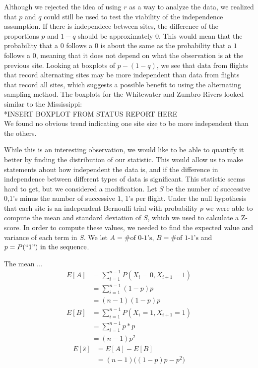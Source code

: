 \documentclass{article}
\begin{document}
	Although we rejected the idea of using \(r\) as a way to analyze the data, 
we realized that \(p\) and \(q\) could still be used to test the viability of 
the independence assumption.  If there is independece between sites, the 
difference of the proportions \(p\) and \(1-q\) should be approximately \(0\). 
This would mean that the probability that a \(0\) follows a \(0\) is about the 
same as the probability that a \(1\) follows a \(0\), meaning that it does not 
depend on what the observation is at the previous site.  Looking at boxplots of 
\(p - (1-q)\), we see that data from flights that record alternating sites may 
be more independent than data from flights that record all sites, which suggests
a possible benefit to using the alternating sampling method.  The boxplots for 
the Whitewater and Zumbro Rivers looked similar to the Mississippi:  \\
*INSERT BOXPLOT FROM STATUS REPORT HERE  \\
We found no obvious trend indicating one site size to be more independent than 
the others.  

	While this is an interesting observation, we would like to be able to 
quantify it better by finding the distribution of our statistic.  This would 
allow us to make statements about how independent the data is, and if the 
difference in independence between different types of data is significant.   
This statistic seems hard to get, but we considered a modification.  Let \(S\) 
be the number of successive \(0\),\(1\)'s minus the number of successive \(1\),
\(1\)'s per flight.  Under the null hypothesis that each site is an independent 
Bernoulli trial with probability \(p\) we were able to compute the mean and 
standard deviation of \(S\), which we used to calculate a Z-score.
	In order to compute these values, we needed to find the expected value and
variance of each term in \(S\).  We let \(A = \text{\# of 0-1's}\), 
\(B = \text{\# of 1-1's}\) and \(p = P(``1")\text{ in the sequence}\).

	The mean ...
 	\begin{align*}
        E[A] 
            &= \sum_{i=1}^{n-1} P(X_i = 0, X_{i+1} = 1) \\
            &= \sum_{i=1}^{n-1} (1-p)p \\
            &= (n-1)(1-p)p
    \end{align*}
    \begin{align*}
        E[B]
            &= \sum_{i=1}^{n-1} P(X_i = 1, X_{i+1} = 1) \\
            &= \sum_{i=1}^{n-1} p*p \\
            &= (n-1)p^2
    \end{align*}
	\begin{align*}
        E[\hat{s}] 
            &= E[A] - E[B] \\
            &= (n-1)\bigg((1-p)p - p^2\bigg)
    \end{align*}
\end{document}
